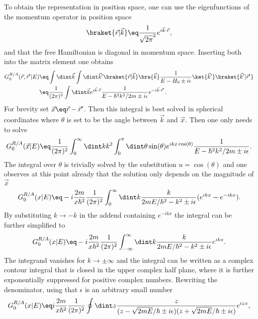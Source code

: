 \documentclass[\main/dresen_thesis.tex]{subfiles}
\begin{document}
To obtain the representation in position space, one can use the eigenfunctions of the momentum operator in position space
\begin{align}
  \braket{\vec{r}|\vec{k}} \eq \frac{1}{\sqrt{2 \pi}^3} e^{i \vec{k} \cdot \vec{r}},
\end{align}
and that the free Hamiltonian is diagonal in momentum space.
Inserting both into the matrix element one obtains
\begin{align}
  G_0^{R/A}(\vec{r}, \vec{r}^\prime | E) \eq & \int \dint \vec{k} \int \dint \vec{k}^\prime \braket{\vec{r} | \vec{k}} \bra{\vec{k}} \frac{1}{E - H_0 \pm i \epsilon} \ket{\vec{k}^\prime} \braket{\vec{k}^\prime | \vec{r}^\prime}\\
  \eq & \frac{1}{(2\pi)^3} \int \dint \vec{k} e^{i \vec{k} \cdot \vec{r}} \frac{1}{E - \hbar^2 k^2 / 2m \pm i \epsilon} e^{-i \vec{k} \cdot \vec{r}^\prime}.
\end{align}
For brevity set $\vec{x} \eq \vec{r} - \vec{r}^\prime$.
Then this integral is best solved in spherical coordinates where $\theta$ is set to be the angle between $\vec{k}$ and $\vec{x}$.
Then one only needs to solve
\begin{align}
  G_0^{R/A}(\vec{x} | E) \eq \frac{1}{(2\pi)^2} \int_0^\infty \dint k k^2 \int_0^{\pi} \dint \theta \sin(\theta) e^{i k x \cos(\theta)} \frac{1}{E - \hbar^2 k^2 / 2m \pm i \epsilon}.
\end{align}
The integral over $\theta$ is trivially solved by the substitution $u = \cos(\theta)$ and one observes at this point already that the solution only depends on the magnitude of $\vec{x}$
\begin{align}
  G_0^{R/A}(x | E) \eq -i \frac{2m}{x\hbar^2} \frac{1}{(2\pi)^2} \int_0^\infty \dint k \frac{k}{2mE/\hbar^2 -  k^2 \pm i \epsilon} (e^{i k x} - e^{-i k x}).
\end{align}
By substituting $k \rightarrow -k$ in the addend containing $e^{-ikx}$ the integral can be further simplified to
\begin{align}
  G_0^{R/A}(x | E) \eq -i \frac{2m}{x\hbar^2} \frac{1}{(2\pi)^2} \int_{-\infty}^\infty \dint k \frac{k}{2mE/\hbar^2 -  k^2 \pm i \epsilon} e^{i k x}.
\end{align}
The integrand vanishes for $k \rightarrow \pm \infty$ and the integral can be written as a complex contour integral that is closed in the upper complex half plane, where it is further exponentially suppressed for positive complex numbers.
Rewriting the denominator, using that $\epsilon$ is an arbitrary small number
\begin{align}
  G_0^{R/A}(x | E) \eq i \frac{2m}{x\hbar^2} \frac{1}{(2\pi)^2} \oint \dint z \frac{z}{(z - \sqrt{2mE}/\hbar \pm i \epsilon)(z + \sqrt{2mE}/\hbar \pm i \epsilon)} e^{i z x},
\end{align}
\end{document}
